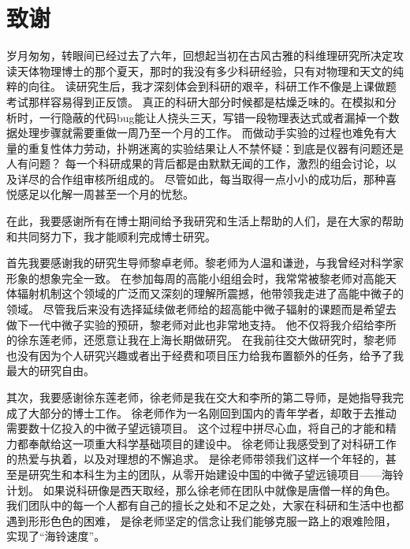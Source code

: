 \chapter{致谢}

岁月匆匆，转眼间已经过去了六年，回想起当初在古风古雅的科维理研究所决定攻读天体物理博士的那个夏天，那时的我没有多少科研经验，只有对物理和天文的纯粹的向往。
读研究生后，我才深刻体会到科研的艰辛，科研工作不像是上课做题考试那样容易得到正反馈。
真正的科研大部分时候都是枯燥乏味的。在模拟和分析时，一行隐蔽的代码bug能让人挠头三天，写错一段物理表达式或者漏掉一个数据处理步骤就需要重做一周乃至一个月的工作。
而做动手实验的过程也难免有大量的重复性体力劳动，扑朔迷离的实验结果让人不禁怀疑：到底是仪器有问题还是人有问题？
每一个科研成果的背后都是由默默无闻的工作，激烈的组会讨论，以及详尽的合作组审核所组成的。
尽管如此，每当取得一点小小的成功后，那种喜悦感足以化解一周甚至一个月的忧愁。

在此，我要感谢所有在博士期间给予我研究和生活上帮助的人们，是在大家的帮助和共同努力下，我才能顺利完成博士研究。

首先我要感谢我的研究生导师黎卓老师。黎老师为人温和谦逊，与我曾经对科学家形象的想象完全一致。
在参加每周的高能小组组会时，我常常被黎老师对高能天体辐射机制这个领域的广泛而又深刻的理解所震撼，他带领我走进了高能中微子的领域。
尽管我后来没有选择延续做老师给的超高能中微子辐射的课题而是希望去做下一代中微子实验的预研，黎老师对此也非常地支持。
他不仅将我介绍给李所的徐东莲老师，还愿意让我在上海长期做研究。
在我前往交大做研究时，黎老师也没有因为个人研究兴趣或者出于经费和项目压力给我布置额外的任务，给予了我最大的研究自由。

其次，我要感谢徐东莲老师，徐老师是我在交大和李所的第二导师，是她指导我完成了大部分的博士工作。
徐老师作为一名刚回到国内的青年学者，却敢于去推动需要数十亿投入的中微子望远镜项目。
这个过程中拼尽心血，将自己的才能和精力都奉献给这一项重大科学基础项目的建设中。
徐老师让我感受到了对科研工作的热爱与执着，以及对理想的不懈追求。
是徐老师带领我们这样一个年轻的，甚至是研究生和本科生为主的团队，从零开始建设中国的中微子望远镜项目——海铃计划。
如果说科研像是西天取经，那么徐老师在团队中就像是唐僧一样的角色。
我们团队中的每一个人都有自己的擅长之处和不足之处，大家在科研和生活中也都遇到形形色色的困难，
是徐老师坚定的信念让我们能够克服一路上的艰难险阻，实现了“海铃速度”。

